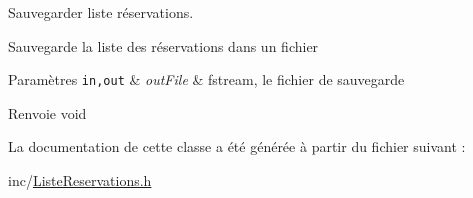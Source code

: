 Sauvegarder liste réservations. 

Sauvegarde la liste des réservations dans un fichier


\begin{DoxyParams}[1]{Paramètres}
\mbox{\tt in,out}  & {\em outFile} & fstream, le fichier de sauvegarde \\
\hline
\end{DoxyParams}
\begin{DoxyReturn}{Renvoie}
void 
\end{DoxyReturn}


La documentation de cette classe a été générée à partir du fichier suivant :\begin{DoxyCompactItemize}
\item 
inc/\hyperlink{_liste_reservations_8h}{ListeReservations.h}\end{DoxyCompactItemize}
